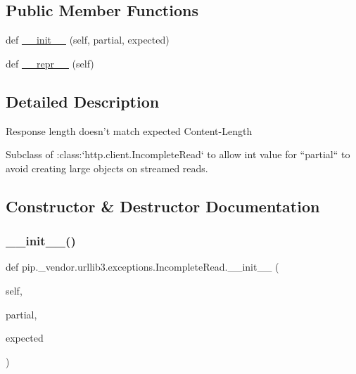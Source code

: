 \subsection*{Public Member Functions}
\begin{DoxyCompactItemize}
\item 
def \hyperlink{classpip_1_1__vendor_1_1urllib3_1_1exceptions_1_1IncompleteRead_a29604cd3bf1f187ab0e0370635a2f615}{\+\_\+\+\_\+init\+\_\+\+\_\+} (self, partial, expected)
\item 
def \hyperlink{classpip_1_1__vendor_1_1urllib3_1_1exceptions_1_1IncompleteRead_a1b03e29e6ae19d82640c2c4685c57ee5}{\+\_\+\+\_\+repr\+\_\+\+\_\+} (self)
\end{DoxyCompactItemize}


\subsection{Detailed Description}
\begin{DoxyVerb}Response length doesn't match expected Content-Length

Subclass of :class:`http.client.IncompleteRead` to allow int value
for ``partial`` to avoid creating large objects on streamed reads.
\end{DoxyVerb}
 

\subsection{Constructor \& Destructor Documentation}
\mbox{\label{classpip_1_1__vendor_1_1urllib3_1_1exceptions_1_1IncompleteRead_a29604cd3bf1f187ab0e0370635a2f615}} 
\subsubsection{\texorpdfstring{\+\_\+\+\_\+init\+\_\+\+\_\+()}{\_\_init\_\_()}}
{\footnotesize\ttfamily def pip.\+\_\+vendor.\+urllib3.\+exceptions.\+Incomplete\+Read.\+\_\+\+\_\+init\+\_\+\+\_\+ (\begin{DoxyParamCaption}\item[{}]{self,  }\item[{}]{partial,  }\item[{}]{expected }\end{DoxyParamCaption})}



